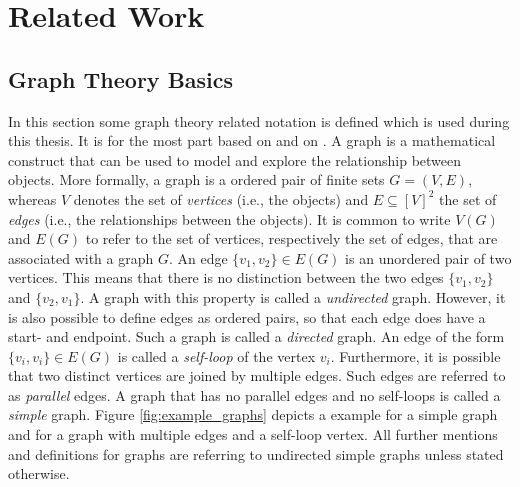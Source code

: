 \chapter{Related Work}


\section{Graph Theory Basics}

In this section some graph theory related notation is defined which is used during this thesis.
It is for the most part based on \cite{Thulasiraman1992} and on \cite{Diestel2012}.
A graph is a mathematical construct that can be used to model and explore the relationship between objects. 
More formally, a graph is a ordered pair of finite sets \(G = (V, E)\), whereas \(V\) denotes the set of \emph{vertices} (i.e., the objects) and \(E \subseteq [V]^2 \) the set of \emph{edges} (i.e., the relationships between the objects).
It is common to write \(V(G)\) and \(E(G)\) to refer to the set of vertices, respectively the set of edges, that are associated with a graph \(G\).
An edge \(\{v_1, v_2\} \in E(G)\) is an unordered pair of two vertices.
This means that there is no distinction between the two edges \(\{v_1, v_2 \}\) and \(\{v_2, v_1\}\). 
A graph with this property is called a \emph{undirected} graph.
However, it is also possible to define edges as ordered pairs, so that each edge does have a start- and endpoint. 
Such a graph is called a \emph{directed} graph.
An edge of the form \(\{v_i, v_i\} \in E(G)\) is called a \emph{self-loop} of the vertex \(v_i\).
Furthermore, it is possible that two distinct vertices are joined by multiple edges. 
Such edges are referred to as \emph{parallel} edges.
A graph that has no parallel edges and no self-loops is called a \emph{simple} graph.
Figure \ref{fig:example_graphs} depicts a example for a simple graph and for a graph with multiple edges and a self-loop vertex.
All further mentions and definitions for graphs are referring to undirected simple graphs unless stated otherwise.

